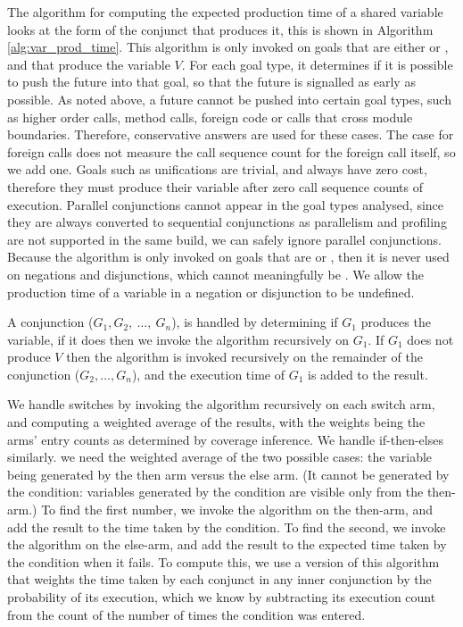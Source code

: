 
The algorithm for computing the expected production time
of a shared variable looks at the form of the conjunct that produces it,
this is shown in Algorithm \ref{alg:var_prod_time}.
This algorithm is only invoked on goals that are either \ddet or \dccmulti,
and that produce the variable $V$.
For each goal type,
it determines if it is possible to push the future into that goal,
so that the future is signalled as early as possible.
As noted above,
a future cannot be pushed into certain goal types,
such as higher order calls, method calls,
foreign code or calls that cross module boundaries.
Therefore,
conservative answers are used for these cases.
The case for foreign calls does not measure the call sequence count for the
foreign call itself, so we add one.
Goals such as unifications are trivial, and always have zero cost,
therefore they must produce their variable after zero call sequence counts
of execution.
Parallel conjunctions cannot appear in the goal types analysed,
since they are always converted to sequential conjunctions as parallelism and
profiling are not supported in the same build,
we can safely ignore parallel conjunctions.
Because the algorithm is only invoked on goals that are \ddet or \dccmulti,
then it is never used on negations and disjunctions,
which cannot meaningfully be \ddet.
We allow the production time of a variable in a negation or disjunction to
be undefined.

A conjunction 
($G_1,G_2,~\ldots,~G_n$),
is handled by determining if $G_1$ produces the variable,
if it does then we invoke the algorithm recursively on $G_1$.
If $G_1$ does not produce $V$ then the algorithm is invoked recursively on
the remainder of the conjunction ($G_2,\ldots,G_n$),
and the execution time of $G_1$ is added to the result.

We handle switches by invoking the algorithm recursively on each switch
arm,
and computing a weighted average of the results,
with the weights being the arms' entry counts as determined by coverage
inference.
We handle if-then-elses similarly.
we need the weighted average of the two possible cases:
the variable being generated by the then arm versus the else arm.
(It cannot be generated by the condition:
variables generated by the condition are visible only from the then-arm.)
To find the first number,
we invoke the algorithm on the then-arm,
and add the result to the time taken by the condition.
To find the second,
we invoke the algorithm on the else-arm,
and add the result to the expected time taken by the condition when it fails.
To compute this, we use a version of this algorithm
that weights the time taken by each conjunct in any inner conjunction
by the probability of its execution,
which we know by subtracting its execution count
from the count of the number of times the condition was entered.

